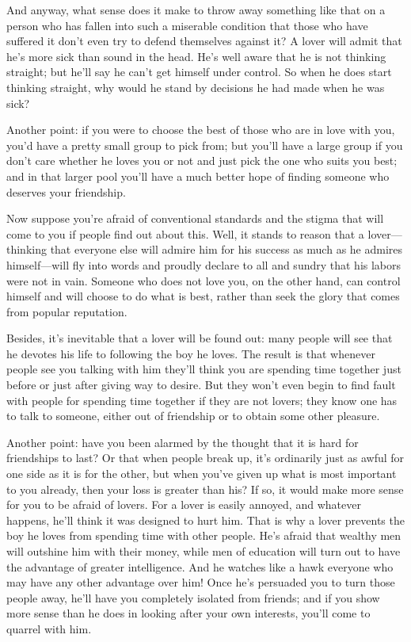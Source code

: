 And anyway, what sense does it make to throw away something like that
on a person who has fallen into such a miserable condition that those 
who have suffered it don’t even try to defend themselves against
it? A lover will admit that he’s more sick than sound in the head. He’s
well aware that he is not thinking straight; but he’ll say he can’t get
himself under control. So when he does start thinking straight, why
would he stand by decisions he had made when he was sick?

Another point: if you were to choose the best of those who are in love
with you, you’d have a pretty small group to pick from; but you’ll have
a large group if you don’t care whether he loves you or not and just
pick the one who suits you best; and in that larger pool you’ll have a
much better hope of finding someone who deserves your friendship.

Now suppose you’re afraid of conventional standards and the stigma that
will come to you if people find out about this. Well, it stands to
reason that a lover---thinking that everyone else will admire him for
his success as much as he admires himself---will fly
into words and proudly declare to all and sundry that his labors were
not in vain. Someone who does not love you, on the other hand, can
control himself and will choose to do what is best, rather than seek the
glory that comes from popular reputation.

Besides, it’s inevitable that a lover will be found out: many people
will see that he devotes his life to following the boy he loves. The
result is that whenever people see you talking with him they’ll
think you are spending time together just before or just after giving
way to desire. But they won’t even begin to find fault with people for
spending time together if they are not lovers; they know one has to talk
to someone, either out of friendship or to obtain some other pleasure.

Another point: have you been alarmed by the thought that it is hard for
friendships to last? Or that when people break up, it’s ordinarily just 
as awful for one side as it is for the other, but when you’ve
given up what is most important to you already, then your loss is
greater than his? If so, it would make more sense for you to be afraid
of lovers. For a lover is easily annoyed, and whatever happens, he’ll
think it was designed to hurt him. That is why a lover prevents the boy
he loves from spending time with other people. He’s afraid that wealthy
men will outshine him with their money, while men of education will turn
out to have the advantage of greater intelligence. And he watches like a
hawk everyone who may have any other advantage over him! Once
he’s persuaded you to turn those people away, he’ll have you completely
isolated from friends; and if you show more sense than he does in
looking after your own interests, you’ll come to quarrel with him.

